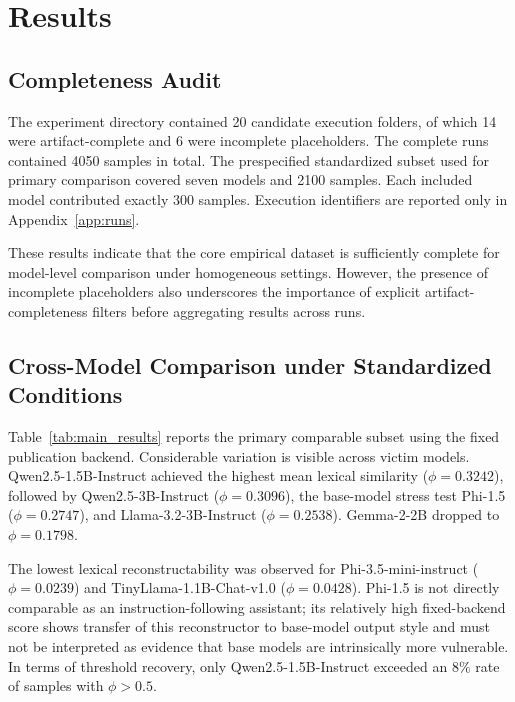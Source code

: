 \documentclass[journal,article,submit,pdftex,moreauthors]{Definitions/mdpi}
\begin{document}
\section{Results}
\subsection{Completeness Audit}
The experiment directory contained 20 candidate execution folders, of which 14 were artifact-complete and 6 were incomplete placeholders. The complete runs contained 4050 samples in total. The prespecified standardized subset used for primary comparison covered seven models and 2100 samples. Each included model contributed exactly 300 samples. Execution identifiers are reported only in Appendix~\ref{app:runs}.

These results indicate that the core empirical dataset is sufficiently complete for model-level comparison under homogeneous settings. However, the presence of incomplete placeholders also underscores the importance of explicit artifact-completeness filters before aggregating results across runs.

\subsection{Cross-Model Comparison under Standardized Conditions}
Table~\ref{tab:main_results} reports the primary comparable subset using the fixed publication backend. Considerable variation is visible across victim models. Qwen2.5-1.5B-Instruct achieved the highest mean lexical similarity ($\phi=0.3242$), followed by Qwen2.5-3B-Instruct ($\phi=0.3096$), the base-model stress test Phi-1.5 ($\phi=0.2747$), and Llama-3.2-3B-Instruct ($\phi=0.2538$). Gemma-2-2B dropped to $\phi=0.1798$.

The lowest lexical reconstructability was observed for Phi-3.5-mini-instruct ($\phi=0.0239$) and TinyLlama-1.1B-Chat-v1.0 ($\phi=0.0428$). Phi-1.5 is not directly comparable as an instruction-following assistant; its relatively high fixed-backend score shows transfer of this reconstructor to base-model output style and must not be interpreted as evidence that base models are intrinsically more vulnerable. In terms of threshold recovery, only Qwen2.5-1.5B-Instruct exceeded an $8\%$ rate of samples with $\phi > 0.5$.
\end{document}
